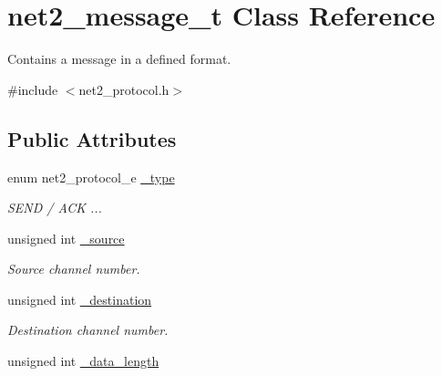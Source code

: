 \hypertarget{structnet2__message__t}{\section{net2\-\_\-message\-\_\-t Class Reference}
\label{structnet2__message__t}
}


Contains a message in a defined format.  




{\ttfamily \#include $<$net2\-\_\-protocol.\-h$>$}

\subsection*{Public Attributes}
\begin{DoxyCompactItemize}
\item 
\hypertarget{structnet2__message__t_adbbcead2b82a531c89222ee6c0ffbc2c}{enum net2\-\_\-protocol\-\_\-e \hyperlink{structnet2__message__t_adbbcead2b82a531c89222ee6c0ffbc2c}{\-\_\-type}}\label{structnet2__message__t_adbbcead2b82a531c89222ee6c0ffbc2c}

\begin{DoxyCompactList}\small\item\em S\-E\-N\-D / A\-C\-K ... \end{DoxyCompactList}\item 
\hypertarget{structnet2__message__t_a391092232c3e5103f92632e192b31a71}{unsigned int \hyperlink{structnet2__message__t_a391092232c3e5103f92632e192b31a71}{\-\_\-source}}\label{structnet2__message__t_a391092232c3e5103f92632e192b31a71}

\begin{DoxyCompactList}\small\item\em Source channel number. \end{DoxyCompactList}\item 
\hypertarget{structnet2__message__t_a86405418417e82e30ab57a5d35ee3fc9}{unsigned int \hyperlink{structnet2__message__t_a86405418417e82e30ab57a5d35ee3fc9}{\-\_\-destination}}\label{structnet2__message__t_a86405418417e82e30ab57a5d35ee3fc9}

\begin{DoxyCompactList}\small\item\em Destination channel number. \end{DoxyCompactList}\item 
\hypertarget{structnet2__message__t_a29ff000a3e877e88c84500a952fed7d1}{unsigned int \hyperlink{structnet2__message__t_a29ff000a3e877e88c84500a952fed7d1}{\-\_\-data\-\_\-length}}\label{structnet2__message__t_a29ff000a3e877e88c84500a952fed7d1}


\end{DoxyCompactItemize}
